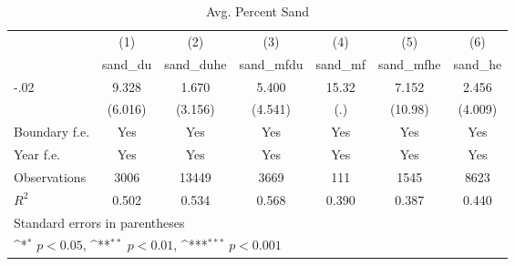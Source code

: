\begin{table}[htbp]\centering
\def\sym#1{\ifmmode^{#1}\else\(^{#1}\)\fi}
\caption{Avg. Percent Sand}
\begin{tabular}{l*{6}{c}}
\hline\hline
                    &\multicolumn{1}{c}{(1)}&\multicolumn{1}{c}{(2)}&\multicolumn{1}{c}{(3)}&\multicolumn{1}{c}{(4)}&\multicolumn{1}{c}{(5)}&\multicolumn{1}{c}{(6)}\\
                    &\multicolumn{1}{c}{sand\_du}&\multicolumn{1}{c}{sand\_duhe}&\multicolumn{1}{c}{sand\_mfdu}&\multicolumn{1}{c}{sand\_mf}&\multicolumn{1}{c}{sand\_mfhe}&\multicolumn{1}{c}{sand\_he}\\
\hline
-.02                &       9.328         &       1.670         &       5.400         &       15.32         &       7.152         &       2.456         \\
                    &     (6.016)         &     (3.156)         &     (4.541)         &         (.)         &     (10.98)         &     (4.009)         \\
[1em]
Boundary f.e.       &         Yes         &         Yes         &         Yes         &         Yes         &         Yes         &         Yes         \\
[1em]
Year f.e.           &         Yes         &         Yes         &         Yes         &         Yes         &         Yes         &         Yes         \\
\hline
Observations        &        3006         &       13449         &        3669         &         111         &        1545         &        8623         \\
\(R^{2}\)           &       0.502         &       0.534         &       0.568         &       0.390         &       0.387         &       0.440         \\
\hline\hline
\multicolumn{7}{l}{\footnotesize Standard errors in parentheses}\\
\multicolumn{7}{l}{\footnotesize \sym{*} \(p<0.05\), \sym{**} \(p<0.01\), \sym{***} \(p<0.001\)}\\
\end{tabular}
\end{table}
